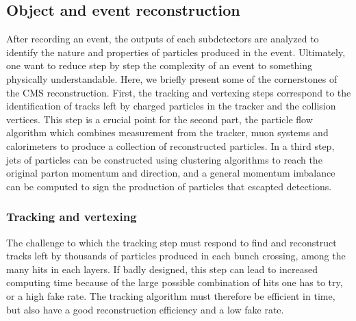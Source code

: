        \subsection{Object and event reconstruction}

        After recording an event, the outputs of each subdetectors
        are analyzed to identify the nature and properties of particles produced in the
        event. Ultimately, one want to reduce step by step the complexity of an event to
        something physically understandable. Here, we briefly present some of the
        cornerstones of the CMS reconstruction. First, the tracking and vertexing steps
        correspond to the identification of tracks left by charged particles in the tracker
        and the collision vertices. This step is a crucial point for the second part, the
        particle flow algorithm which combines measurement from the tracker, muon systems
        and calorimeters to produce a collection of reconstructed particles. In a third step,
        jets of particles can be constructed using clustering algorithms to reach the original
        parton momentum and direction, and a general momentum imbalance can be computed
        to sign the production of particles that escapted detections.

            \subsubsection{Tracking and vertexing \label{sec:trackingAndVertexing}}

        The challenge to which the tracking step must respond to find and reconstruct
        tracks left by thousands of particles produced in each bunch crossing, among the
        many hits in each layers. If badly designed, this step can lead to increased
        computing time because of the large possible combination of hits one has to try,
        or a high fake rate. The tracking algorithm must therefore be efficient in time,
        but also have a good reconstruction efficiency and a low fake rate.


